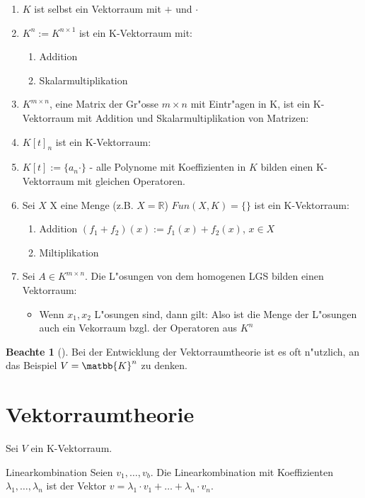 \documentclass[oneside,fontsize=11pt,paper=a4,BCOR=0mm,DIV=12,automark,headsepline]{scrbook}
\theoremstyle{remark}
\theoremstyle{definition}
\newtheorem*{notte}{Beachte}
\theoremstyle{definition}
\theoremstyle{remark}
\begin{document}
\begin{exa}
  \begin{enumerate}
  \item \(K\) ist selbst ein Vektorraum mit \(+\) und \(\cdot\)
  \item \(K^{n}:=K^{n\times 1}\) ist ein K-Vektorraum mit:
    \begin{enumerate}
    \item Addition
    \item Skalarmultiplikation
    \end{enumerate}
  \item \(K^{m \times n}\), eine Matrix der Gr"osse \(m\times n\) mit Eintr"agen in K,
    ist ein K-Vektorraum mit Addition und Skalarmultiplikation von Matrizen:
  \item \(K[t]_n\) ist ein K-Vektorraum:
  \item \(K[t]:=\{a_n\cdot \}\) - alle Polynome mit Koeffizienten in \(K\) bilden einen
    K-Vektorraum mit gleichen Operatoren.
  \item Sei \(X\) X eine Menge (z.B. \(X=\mathbb{R}\)) \(Fun(X,K)=\{\}\) ist ein K-Vektorraum:
    \begin{enumerate}
    \item Addition \((f_1 + f_2)(x):= f_1(x)+ f_2(x)\), \(x\in X\)
    \item Miltiplikation
    \end{enumerate}
  \item Sei \(A\in K^{m\times n}\). Die L"osungen von dem homogenen LGS bilden einen
    Vektorraum:
    \begin{itemize}
    \item Wenn \(x_1,x_2\) L"osungen sind, dann gilt: Also ist die Menge der
      L"osungen auch ein Vekorraum bzgl. der Operatoren aus \(K^n\)
    \end{itemize}
  \end{enumerate}
\end{exa}

\begin{notte}[]
  Bei der Entwicklung der Vektorraumtheorie ist es oft n"utzlich, an das Beispiel
  \(V=\matbb{K}^n\) zu denken.
\end{notte}

\chapter{Vektorraumtheorie}
\label{sec:org432e282}
Sei \(V\) ein K-Vektorraum.

\begin{definition}{Linearkombination}{}
  Seien \(v_1, \dots, v_b\). Die Linearkombination mit Koeffizienten $\lambda_1, \dots, \lambda_n$ ist der Vektor $v=\lambda_1\cdot v_1 + \dots + \lambda_n \cdot v_n$.
\end{definition}
\end{document}
